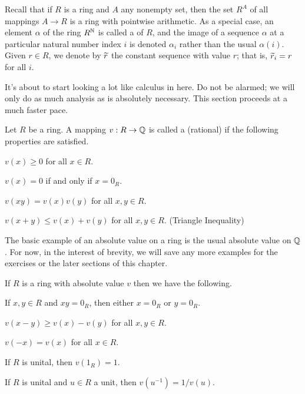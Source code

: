 Recall that if \(R\) is a ring and \(A\) any nonempty set, then the set \(R^A\) of all mappings \(A \rightarrow R\) is a ring with pointwise arithmetic. As a special case, an element \(\alpha\) of the ring \(R^{\mathbb{N}}\) is called a  of \(R\), and the image of a sequence \(\alpha\) at a particular natural number index \(i\) is denoted \(\alpha_i\) rather than the usual \(\alpha(i)\). Given \(r \in R\), we denote by \(\widetilde{r}\) the constant sequence with value \(r\); that is, \(\widetilde{r}_i = r\) for all \(i\).

It's about to start looking a lot like calculus in here. Do not be alarmed; we will only do as much analysis as is absolutely necessary. This section proceeds at a much faster pace.

\begin{dfn} \label{dfn:abs-val}
Let \(R\) be a ring. A mapping \(v : R \rightarrow \mathbb{Q}\) is called a (rational)  if the following properties are satisfied.
\begin{proplist}
\item \(v(x) \geq 0\) for all \(x \in R\).
\item \(v(x) = 0\) if and only if \(x = 0_R\).
\item \(v(xy) = v(x)v(y)\) for all \(x,y \in R\).
\item \(v(x+y) \leq v(x) + v(y)\) for all \(x,y \in R\). (Triangle Inequality)
\end{proplist}
\end{dfn}

The basic example of an absolute value on a ring is the usual absolute value on \(\mathbb{Q}\). For now, in the interest of brevity, we will save any more examples for the exercises or the later sections of this chapter.

\begin{prop} \label{prop:abs-val-basics}
If \(R\) is a ring with absolute value \(v\) then we have the following.
\begin{proplist}
\item If \(x,y \in R\) and \(xy = 0_R\), then either \(x = 0_R\) or \(y = 0_R\).
\item \(v(x-y) \geq v(x) - v(y)\) for all \(x,y \in R\). \label{prop:abs-val-basics:reverse-ti}
\item \(v(-x) = v(x)\) for all \(x \in R\).
\item If \(R\) is unital, then \(v(1_R) = 1\).
\item If \(R\) is unital and \(u \in R\) a unit, then \(v(u^{-1}) = 1/v(u)\).
\end{proplist}
\end{prop}

